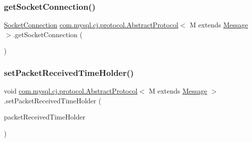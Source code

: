 \mbox{\label{classcom_1_1mysql_1_1cj_1_1protocol_1_1_abstract_protocol_a362f267df93632ef543be7d6f4cc13ba}} 
\subsubsection{\texorpdfstring{get\+Socket\+Connection()}{getSocketConnection()}}
{\footnotesize\ttfamily \mbox{\hyperlink{interfacecom_1_1mysql_1_1cj_1_1protocol_1_1_socket_connection}{Socket\+Connection}} \mbox{\hyperlink{classcom_1_1mysql_1_1cj_1_1protocol_1_1_abstract_protocol}{com.\+mysql.\+cj.\+protocol.\+Abstract\+Protocol}}$<$ M extends \mbox{\hyperlink{interfacecom_1_1mysql_1_1cj_1_1protocol_1_1_message}{Message}} $>$.get\+Socket\+Connection (\begin{DoxyParamCaption}{ }\end{DoxyParamCaption})}

\mbox{\label{classcom_1_1mysql_1_1cj_1_1protocol_1_1_abstract_protocol_a291f8eb4df14bd41f3f22f2c197ff4e5}} 
\subsubsection{\texorpdfstring{set\+Packet\+Received\+Time\+Holder()}{setPacketReceivedTimeHolder()}}
{\footnotesize\ttfamily void \mbox{\hyperlink{classcom_1_1mysql_1_1cj_1_1protocol_1_1_abstract_protocol}{com.\+mysql.\+cj.\+protocol.\+Abstract\+Protocol}}$<$ M extends \mbox{\hyperlink{interfacecom_1_1mysql_1_1cj_1_1protocol_1_1_message}{Message}} $>$.set\+Packet\+Received\+Time\+Holder (\begin{DoxyParamCaption}\item[{\mbox{\hyperlink{interfacecom_1_1mysql_1_1cj_1_1protocol_1_1_packet_received_time_holder}{Packet\+Received\+Time\+Holder}}}]{packet\+Received\+Time\+Holder }\end{DoxyParamCaption})}

